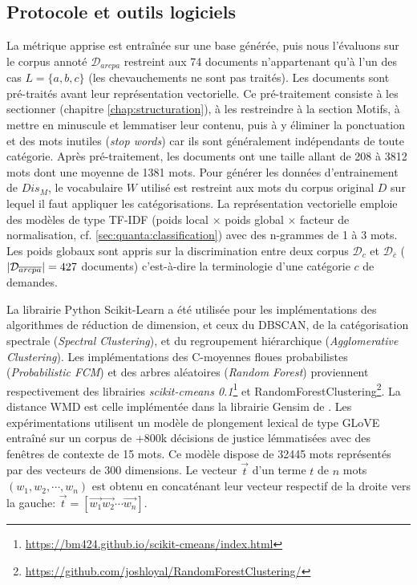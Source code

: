 \subsection{Protocole et outils logiciels}
La métrique apprise est entraînée sur une base générée, puis nous l'évaluons sur le corpus annoté $\mathcal{D}_{arcpa}$ restreint aux 74 documents n'appartenant qu'à l'un des cas $L = \lbrace a, b, c \rbrace$ (les chevauchements ne sont pas traités).  Les documents sont pré-traités avant leur représentation vectorielle. Ce pré-traitement consiste à les  sectionner (chapitre \ref{chap:structuration}), à les restreindre à la section Motifs, à mettre en minuscule et lemmatiser leur contenu, puis à y éliminer la ponctuation et des mots inutiles (\textit{stop words})  car ils sont généralement indépendants de toute catégorie. Après pré-traitement, les documents ont une taille allant de 208 à 3812 mots dont une moyenne de 1381 mots. Pour générer les données  d'entrainement de $Dis_M$, le vocabulaire $W$ utilisé est restreint aux mots du corpus original $D$ sur lequel il faut appliquer les catégorisations. La représentation vectorielle emploie des modèles de type TF-IDF (poids local $\times$ poids global $\times$ facteur de normalisation, cf. \ref{sec:quanta:classification}) avec des n-grammes de 1 à 3 mots. %
Les poids globaux sont appris sur la discrimination entre deux corpus $\mathcal{D}_{c}$ et $\mathcal{D}_{\overline{c}}$ (${\vert\mathcal{D}_{\overline{arcpa}}\vert} = 427$ documents) c'est-à-dire la terminologie d'une catégorie $c$ de demandes.

 La librairie Python Scikit-Learn \citep{Pedregosa2011scikit-learn} a été utilisée pour les implémentations des algorithmes de réduction de dimension, et ceux du DBSCAN, de la catégorisation spectrale (\textit{Spectral Clustering}), et du regroupement hiérarchique (\textit{Agglomerative Clustering}). Les implémentations des C-moyennes floues probabilistes (\textit{Probabilistic FCM}) et des arbres aléatoires (\textit{Random Forest}) proviennent respectivement des librairies \textit{scikit-cmeans 0.1}\footnote{\url{https://bm424.github.io/scikit-cmeans/index.html}} et RandomForestClustering\footnote{\url{https://github.com/joshloyal/RandomForestClustering/}}. La distance WMD est celle implémentée dans la librairie Gensim de \citet{rehurek2010gensim}. Les expérimentations utilisent un modèle de plongement lexical de type GLoVE  \citep{pennington2014glove} entraîné sur un corpus de +800k décisions de justice lémmatisées avec des fenêtres de contexte de 15 mots. Ce modèle dispose de 32445 mots représentés par des vecteurs de 300 dimensions. Le vecteur $\vec{t}$ d'un terme $t$ de $n$ mots $(w_1, w_2, \cdots, w_n)$ est obtenu en concaténant leur vecteur respectif de la droite vers la gauche: $\vec{t}=[\vec{w_1}\vec{w_2}\cdots \vec{w_n}]$.

